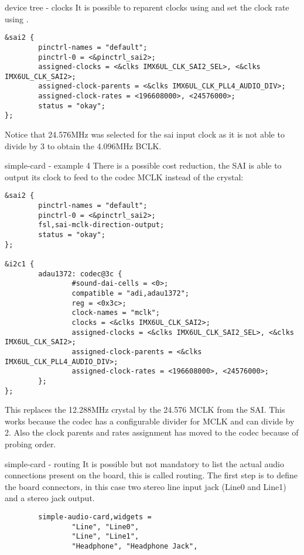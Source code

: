 \begin{frame}[fragile]{device tree - clocks}
  It is possible to reparent clocks using
   and set the clock rate using
  .
  \begin{block}{}
    \fontsize{7}{6}\selectfont
    \begin{verbatim}
&sai2 {
        pinctrl-names = "default";
        pinctrl-0 = <&pinctrl_sai2>;
        assigned-clocks = <&clks IMX6UL_CLK_SAI2_SEL>, <&clks IMX6UL_CLK_SAI2>;
        assigned-clock-parents = <&clks IMX6UL_CLK_PLL4_AUDIO_DIV>;
        assigned-clock-rates = <196608000>, <24576000>;
        status = "okay";
};
    \end{verbatim}
  \end{block}
  Notice that 24.576MHz was selected for the sai input clock as it is
  not able to divide by 3 to obtain the 4.096MHz BCLK.
\end{frame}

\begin{frame}[fragile]{simple-card - example 4}
  There is a possible cost reduction, the SAI is able to output its
  clock to feed to the codec MCLK instead of the crystal:
  \begin{block}{}
    \fontsize{7}{6}\selectfont
    \begin{verbatim}
&sai2 {
        pinctrl-names = "default";
        pinctrl-0 = <&pinctrl_sai2>;
        fsl,sai-mclk-direction-output;
        status = "okay";
};

&i2c1 {
        adau1372: codec@3c {
                #sound-dai-cells = <0>;
                compatible = "adi,adau1372";
                reg = <0x3c>;
                clock-names = "mclk";
                clocks = <&clks IMX6UL_CLK_SAI2>;
                assigned-clocks = <&clks IMX6UL_CLK_SAI2_SEL>, <&clks IMX6UL_CLK_SAI2>;
                assigned-clock-parents = <&clks IMX6UL_CLK_PLL4_AUDIO_DIV>;
                assigned-clock-rates = <196608000>, <24576000>;
        };
};
    \end{verbatim}
  \end{block}
  This replaces the 12.288MHz crystal by the 24.576 MCLK from the SAI.
  This works because the codec has a configurable divider for MCLK and
  can divide by 2. Also the clock parents and rates assignment has
  moved to the codec because of probing order.
\end{frame}

\begin{frame}[fragile]{simple-card - routing}
  It is possible but not mandatory to list the actual audio
  connections present on the board, this is called routing.
  The first step is to define the board connectors, in this case two
  stereo line input jack (Line0 and Line1) and a stereo jack output.
  \begin{block}{}
    \fontsize{7}{6}\selectfont
    \begin{verbatim}
        simple-audio-card,widgets =
                "Line", "Line0",
                "Line", "Line1",
                "Headphone", "Headphone Jack",
    \end{verbatim}
  \end{block}
\end{frame}

